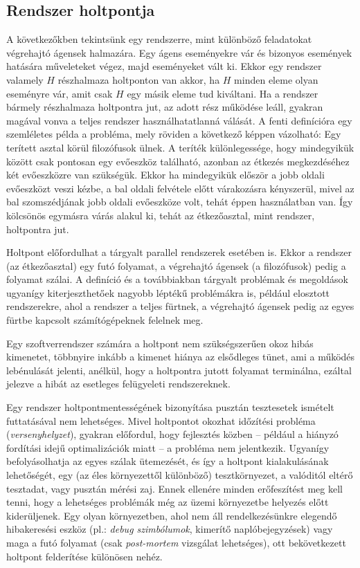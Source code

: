     \vfill
        
    \subsection{Rendszer holtpontja} 
      
    A következőkben tekintsünk egy rendszerre, mint különböző feladatokat végrehajtó ágensek halmazára. Egy ágens eseményekre vár és bizonyos események hatására műveleteket végez, majd eseményeket vált ki. Ekkor egy rendszer valamely $H$ részhalmaza holtponton van akkor, ha $H$ minden eleme olyan eseményre vár, amit csak $H$ egy másik eleme tud kiváltani. Ha a rendszer bármely részhalmaza holtpontra jut, az adott rész működése leáll, gyakran magával vonva a teljes rendszer használhatatlanná válását. A fenti definícióra egy szemléletes példa a \cite{DiningPhilosophers} probléma, mely röviden a következő képpen vázolható: Egy terített asztal körül filozófusok ülnek. A teríték különlegessége, hogy mindegyikük között csak pontosan egy evőeszköz található, azonban az étkezés megkezdéséhez két evőeszközre van szükségük. Ekkor ha mindegyikük először a jobb oldali evőeszközt veszi kézbe, a bal oldali felvétele előtt várakozásra kényszerül, mivel az bal szomszédjának jobb oldali evőeszköze volt, tehát éppen használatban van. Így kölcsönös egymásra várás alakul ki, tehát az étkezőasztal, mint rendszer, holtpontra jut.
    
    Holtpont előfordulhat a tárgyalt parallel rendszerek esetében is. Ekkor a rendszer (az étkezőasztal) egy futó folyamat, a végrehajtó ágensek (a filozófusok) pedig a folyamat szálai. A definíció és a továbbiakban tárgyalt problémak és megoldások ugyanígy kiterjeszthetőek nagyobb léptékű problémákra is, például elosztott rendszerekre, ahol a rendszer a teljes fürtnek, a végrehajtó ágensek pedig az egyes fürtbe kapcsolt számítógépeknek felelnek meg.
    
    Egy szoftverrendszer számára a holtpont nem szükségszerűen okoz hibás kimenetet, többnyire inkább a kimenet hiánya az elsődleges tünet, ami a működés lebénulását jelenti, anélkül, hogy a holtpontra jutott folyamat terminálna, ezáltal jelezve a hibát az esetleges felügyeleti rendszereknek.
    
    Egy rendszer holtpontmentességének bizonyítása pusztán tesztesetek ismételt futtatásával nem lehetséges. Mivel holtpontot okozhat időzítési probléma (\emph{versenyhelyzet}), gyakran előfordul, hogy fejlesztés közben -- például a hiányzó fordítási idejű optimalizációk miatt -- a probléma nem jelentkezik. Ugyanígy befolyásolhatja az egyes szálak ütemezését, és így a holtpont kialakulásának lehetőségét, egy (az éles környezettől különböző) tesztkörnyezet, a valóditól eltérő tesztadat, vagy pusztán mérési zaj. Ennek ellenére minden erőfeszítést meg kell tenni, hogy a lehetséges problémák még az üzemi környezetbe helyezés előtt kiderüljenek. Egy olyan környezetben, ahol nem áll rendelkezésünkre elegendő hibakeresési eszköz (pl.: \emph{debug szimbólumok}, kimerítő naplóbejegyzések) vagy maga a futó folyamat (csak \emph{post-mortem} vizsgálat lehetséges), ott bekövetkezett holtpont felderítése különösen nehéz.
    
